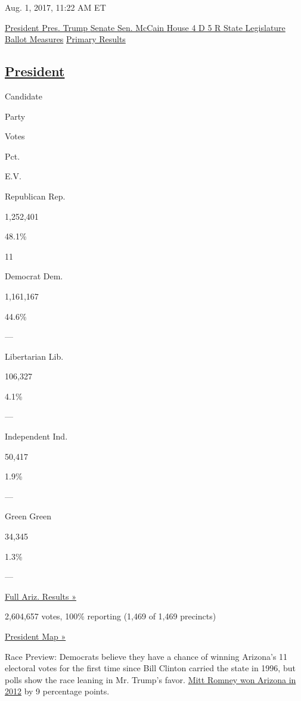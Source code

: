  Aug. 1, 2017, 11:22 AM ET

\protect\hyperlink{president}{ President Pres. Trump }
\protect\hyperlink{senate}{ Senate Sen. McCain }
\protect\hyperlink{house}{House 4 D 5 R }
\protect\hyperlink{state-legislature}{State Legislature}
\protect\hyperlink{ballot-measure}{Ballot Measures}
\href{//www.nytimes3xbfgragh.onion/elections/2016/results/primaries/arizona}{Primary
Results}

\hypertarget{president}{%
\subsection{\texorpdfstring{\href{https://www.nytimes3xbfgragh.onion/elections/2016/results/arizona-president-clinton-trump}{President}}{President}}\label{president}}

Candidate

Party

Votes

Pct.

E.V.

Republican Rep.

1,252,401

48.1\%

11

Democrat Dem.

1,161,167

44.6\%

---

Libertarian Lib.

106,327

4.1\%

---

Independent Ind.

50,417

1.9\%

---

Green Green

34,345

1.3\%

---

\href{https://www.nytimes3xbfgragh.onion/elections/2016/results/arizona}{Full
Ariz. Results »}

2,604,657 votes, 100\% reporting (1,469 of 1,469 precincts)

\href{//www.nytimes3xbfgragh.onion/elections/2016/results/president}{President
Map »}

Race Preview: Democrats believe they have a chance of winning Arizona's
11 electoral votes for the first time since Bill Clinton carried the
state in 1996, but polls show the race leaning in Mr. Trump's favor.
\href{//elections.nytimes3xbfgragh.onion/2012/results/states/arizona}{Mitt
Romney won Arizona in 2012} by 9 percentage points.


